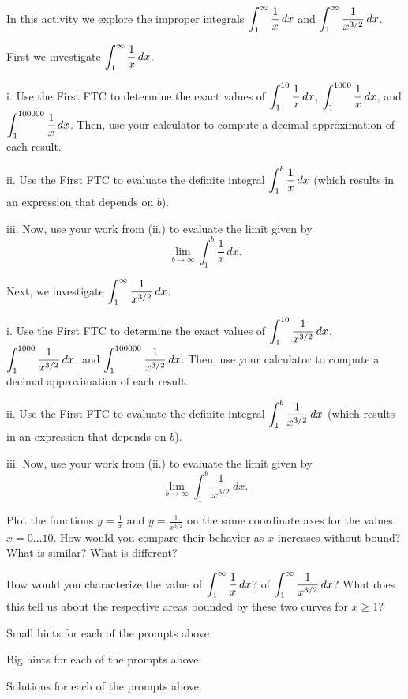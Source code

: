 \begin{activity} \label{A:5.5.1}  In this activity we explore the improper integrals $\displaystyle \int_1^{\infty} \frac{1}{x} \, dx$ and $\displaystyle \int_1^{\infty} \frac{1}{x^{3/2}} \, dx$.
\ba
	\item First we investigate $\displaystyle \int_1^{\infty} \frac{1}{x} \, dx$.
	\be
		\item[i.] Use the First FTC to determine the exact values of $\displaystyle \int_1^{10} \frac{1}{x} \, dx$, $\displaystyle \int_1^{1000} \frac{1}{x} \, dx$, and $\displaystyle \int_1^{100000} \frac{1}{x} \, dx$.  Then, use your calculator to compute a decimal approximation of each result.
		\item[ii.]  Use the First FTC to evaluate the definite integral $\displaystyle \int_1^{b} \frac{1}{x} \, dx$ (which results in an expression that depends on $b$).
		\item[iii.]  Now, use your work from (ii.) to evaluate the limit given by
	$$\lim_{b \to \infty}  \int_1^{b} \frac{1}{x} \, dx.$$
	\ee
	\item Next, we investigate $\displaystyle \int_1^{\infty} \frac{1}{x^{3/2}} \, dx$.
	\be
		\item[i.] Use the First FTC to determine the exact values of $\displaystyle \int_1^{10} \frac{1}{x^{3/2}} \, dx$, $\displaystyle \int_1^{1000} \frac{1}{x^{3/2}} \, dx$, and $\displaystyle \int_1^{100000} \frac{1}{x^{3/2}} \, dx$.  Then, use your calculator to compute a decimal approximation of each result.
		\item[ii.]  Use the First FTC to evaluate the definite integral $\displaystyle \int_1^{b} \frac{1}{x^{3/2}} \, dx$ (which results in an expression that depends on $b$).
		\item[iii.]  Now, use your work from (ii.) to evaluate the limit given by
	$$\lim_{b \to \infty}  \int_1^{b} \frac{1}{x^{3/2}} \, dx.$$
	\ee
	\item Plot the functions $y = \frac{1}{x}$ and $y = \frac{1}{x^{3/2}}$ on the same coordinate axes for the values $x = 0 \ldots 10$.  How would you compare their behavior as $x$ increases without bound?  What is similar?  What is different?
	\item How would you characterize the value of $\displaystyle \int_1^{\infty} \frac{1}{x} \, dx$? of $\displaystyle \int_1^{\infty} \frac{1}{x^{3/2}} \, dx$?  What does this tell us about the respective areas bounded by these two curves for $x \ge 1$?
\ea

\end{activity}
\begin{smallhint}
\ba
	\item Small hints for each of the prompts above.
\ea
\end{smallhint}
\begin{bighint}
\ba
	\item Big hints for each of the prompts above.
\ea
\end{bighint}
\begin{activitySolution}
\ba
	\item Solutions for each of the prompts above.
\ea
\end{activitySolution}
\aftera